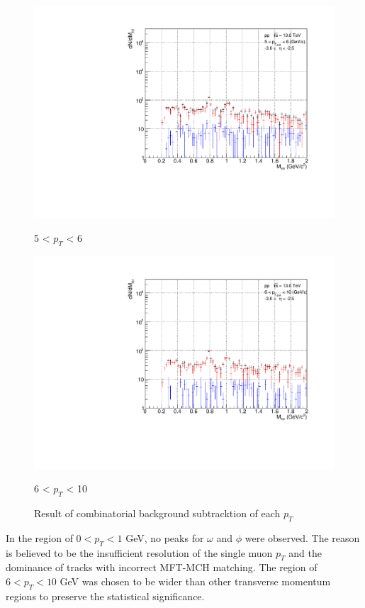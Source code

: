 \begin{figure}[H]
                    \vspace{1em}
                    \begin{minipage}{0.45\textwidth}
                        \centering
                        \includegraphics[width=\textwidth]{fig/3_4_1_CB_pt_5to6.pdf}
                        \caption*{5 < $p_{T}$ < 6}
                    \end{minipage}
                    \hfill
                    \begin{minipage}{0.45\textwidth}
                        \centering
                        \includegraphics[width=\textwidth]{fig/3_4_1_CB_pt_6to10.pdf}
                        \caption*{6 < $p_{T}$ < 10}
                    \end{minipage}
                    \caption{Result of combinatorial background subtracktion of each $p_T$}
                    \label{Analysis:Dimuon:CB:CB_pt_separation}
                \end{figure}
                In the region of \(0 < p_T < 1\) GeV, no peaks for \(\omega\) and \(\phi\) were observed. The reason is believed to be the insufficient resolution of the single muon \(p_T\) and the dominance of tracks with incorrect MFT-MCH matching.
                The region of \(6 < p_T < 10\) GeV was chosen to be wider than other transverse momentum regions to preserve the statistical significance.
        
